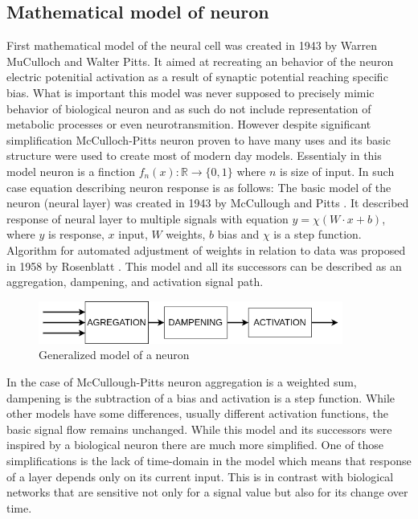 \subsection{Mathematical model of neuron}
First mathematical model of the neural cell was created in 1943 by Warren MuCulloch and Walter Pitts.
It aimed at recreating an behavior of the neuron electric potenitial activation as a result of
synaptic potential reaching specific bias. What is important this model was never supposed to
precisely mimic behavior of biological neuron and as such do not include representation of metabolic
processes or even neurotransmition.
However despite significant simplification McCulloch-Pitts neuron proven to have many uses and
its basic structure were used to create most of modern day models.
Essentialy in this model neuron is a finction $f_n(x):\mathbb{R} \rightarrow \{ 0,1 \} $ where $n$
is size of input.
In such case equation describing neuron response is as follows:
The basic model of the neuron (neural layer) was created in 1943 by McCullough and Pitts 
\cite{McCulloch1943}. It described response of neural layer to multiple signals with
equation $y= \chi (W\cdot x+b)$, where $y$ is response, $x$ input, $W$ weights, $b$ bias and
$\chi$ is a step function.
Algorithm for automated adjustment of weights in relation to data was proposed in 1958
by Rosenblatt \cite{Rosenblatt58}. This model and all its successors can be described
as an aggregation, dampening, and activation signal path.
\begin{figure}[h] 
	\centering
	\includegraphics[width=10cm]{res/basic_neuron}
	\caption{Generalized model of a neuron}
	\label{fig:basic_neuron}
\end{figure}
In the case of McCullough-Pitts neuron aggregation is a weighted sum, dampening is the subtraction
of a bias and activation is a step function. While other models have some differences,
usually different activation functions, the basic signal flow remains unchanged.
While this model and its successors were inspired by a biological neuron there are much
more simplified. One of those simplifications is the lack of time-domain in the model which means
that response of a layer depends only on its current input.
This is in contrast with biological networks that are sensitive not only for a signal value
but also for its change over time.

